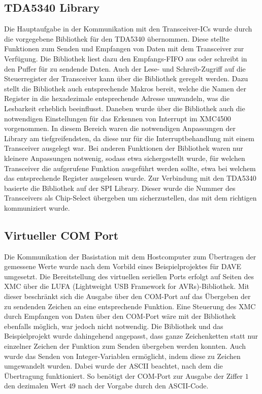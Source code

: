 \subsection{TDA5340 Library}
Die Hauptaufgabe in der Kommunikation mit den Transceiver-\acp{IC} wurde durch die vorgegebene Bibliothek für den TDA5340 übernommen. Diese stellte Funktionen zum Senden und Empfangen von Daten mit dem Transceiver zur Verfügung. Die Bibliothek liest dazu den Empfangs-\ac{FIFO} aus oder schreibt in den Puffer für zu sendende Daten. Auch der Lese- und Schreib-Zugriff auf die Steuerregister der Transceiver kann über die Bibliothek geregelt werden. Dazu stellt die Bibliothek auch entsprechende Makros bereit, welche die Namen der Register in die hexadezimale entsprechende Adresse umwandeln, was die Lesbarkeit erheblich beeinflusst. Daneben wurde über die Bibliothek auch die notwendigen  Einstellungen für das Erkennen von Interrupt im XMC4500 vorgenommen. In diesem Bereich waren die notwendigen Anpassungen der Library am tiefgreifendsten, da diese nur für die Interruptbehandlung mit einem Transceiver ausgelegt war. Bei anderen Funktionen der Bibliothek waren nur kleinere Anpassungen notwenig, sodass etwa sichergestellt wurde, für welchen Transceiver die aufgerufene Funktion ausgeführt werden sollte, etwa bei welchem das entsprechende Register ausgelesen wurde.
Zur Verbindung mit den TDA5340 basierte die Bibliothek auf der SPI Library. Dieser wurde die Nummer des Transceivers als Chip-Select übergeben um sicherzustellen, das mit dem richtigen kommuniziert wurde.


\subsection{Virtueller COM Port}
Die Kommunikation der Basistation mit dem Hostcomputer zum Übertragen der gemessene Werte wurde nach dem Vorbild eines Beispielprojektes für DAVE umgesetzt. Die Bereitstellung des virtuellen seriellen Ports erfolgt auf Seiten des XMC über die LUFA (Lightweight USB Framework for AVRs)-Bibliothek. Mit dieser beschränkt sich die Ausgabe über den COM-Port auf das Übergeben der zu sendenden Zeichen an eine entsprechende Funktion. Eine Steuerung des XMC durch Empfangen von Daten über den COM-Port wäre mit der Bibliothek ebenfalls möglich, war jedoch nicht notwendig.
Die Bibliothek und das Beispielprojekt wurde dahingehend angepasst, dass ganze Zeichenketten statt nur einzelner Zeichen der Funktion zum Senden übergeben werden konnten. Auch wurde das Senden von Integer-Variablen ermöglicht, indem diese zu Zeichen umgewandelt wurden. Dabei wurde der \ac{ASCII} beachtet, nach dem die Übertragung funktioniert. So benötigt der COM-Port zur Ausgabe der Ziffer $1$ den dezimalen Wert $49$ nach der Vorgabe durch den \ac{ASCII}-Code.


